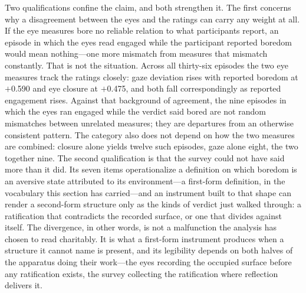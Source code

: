 Two qualifications confine the claim, and both strengthen it. The first concerns why a
disagreement between the eyes and the ratings can carry any weight at all. If the eye measures
bore no reliable relation to what participants report, an episode in which the eyes read
engaged while the participant reported boredom would mean nothing---one more mismatch from
measures that mismatch constantly. That is not the situation. Across all thirty-six episodes
the two eye measures track the ratings closely: gaze deviation rises with reported boredom at
$+$0.590 and eye closure at $+$0.475, and both fall correspondingly as reported engagement
rises. Against that background of agreement, the nine episodes in which the eyes ran engaged
while the verdict said bored are not random mismatches between unrelated measures; they are
departures from an otherwise consistent pattern. The category also does not depend
on how the two measures are combined: closure alone yields twelve such episodes, gaze alone
eight, the two together nine. The second qualification is that the survey could not have said more than it
did. Its seven items operationalize a definition on which boredom is an aversive state
attributed to its environment---a first-form definition, in the vocabulary this section has
carried---and an instrument built to that shape can render a second-form structure only as the
kinds of verdict just walked through: a ratification that contradicts the recorded surface, or
one that divides against itself. The divergence, in other words, is not a malfunction the
analysis has chosen to read charitably. It is what a first-form instrument produces when a
structure it cannot name is present, and its legibility depends on both halves of the apparatus
doing their work---the eyes recording the occupied surface before any ratification exists, the
survey collecting the ratification where reflection delivers it.

